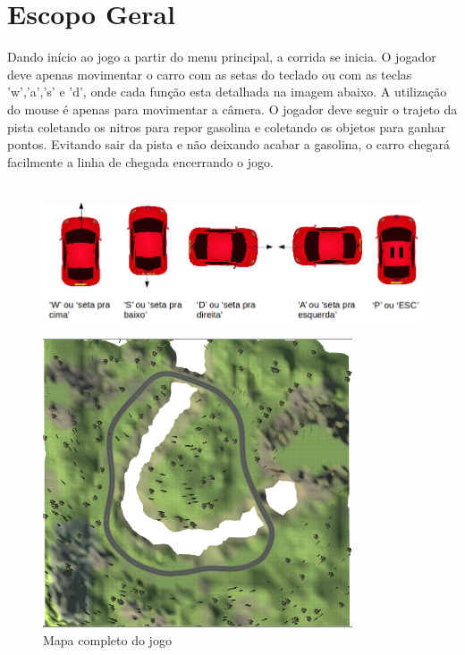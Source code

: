 \documentclass[12pt]{article}
\begin{document}


\onehalfspacing
\tableofcontents
\newpage

\part{Escopo Geral}

Dando início ao jogo a partir do menu principal, a corrida se inicia. O jogador deve apenas movimentar o carro com as setas do teclado ou com as teclas 'w','a','s' e 'd', onde cada função esta detalhada na imagem abaixo. A utilização do mouse é apenas para movimentar a câmera. O jogador deve seguir o trajeto da pista coletando os nitros para repor gasolina e coletando os objetos para ganhar pontos. Evitando sair da pista e não deixando acabar a gasolina, o carro chegará facilmente a linha de chegada encerrando o jogo. \\\\ 

\begin{figure}[!h]
	\centering
		\includegraphics[scale=0.5]{movimentos}
\end{figure}

\begin{figure}[!h]
	\centering
		\includegraphics[scale=0.8]{percurso}
	\caption{Mapa completo do jogo}
\end{figure}
\end{document}
